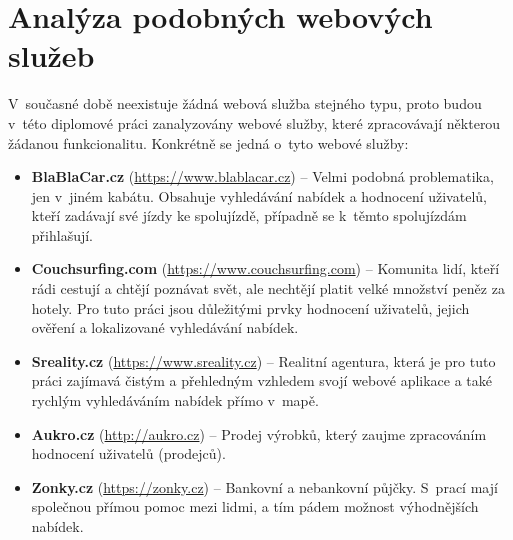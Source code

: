 \chapter{Analýza podobných webových služeb}
\label{analyza}

V~současné době neexistuje žádná webová služba stejného typu, proto budou v~této diplomové práci zanalyzovány webové služby, které zpracovávají některou žádanou funkcionalitu. Konkrétně se jedná o~tyto webové služby:
\begin{itemize}
	\item \textbf{BlaBlaCar.cz} \cite{blablacar} (\url{https://www.blablacar.cz}) -- Velmi podobná problematika, jen v~jiném kabátu. Obsahuje vyhledávání nabídek a hodnocení uživatelů, kteří zadávají své jízdy ke spolujízdě, případně se k~těmto spolujízdám přihlašují.
	\item \textbf{Couchsurfing.com} \cite{couchsurfing} (\url{https://www.couchsurfing.com}) -- Komunita lidí, kteří rádi cestují a chtějí poznávat svět, ale nechtějí platit velké množství peněz za hotely. Pro tuto práci jsou důležitými prvky hodnocení uživatelů, jejich ověření a lokalizované vyhledávání nabídek.
	\item \textbf{Sreality.cz} \cite{sreality} (\url{https://www.sreality.cz}) -- Realitní agentura, která je pro tuto práci zajímavá čistým a přehledným vzhledem svojí webové aplikace a také rychlým vyhledáváním nabídek přímo v~mapě.
	\item \textbf{Aukro.cz} \cite{aukro} (\url{http://aukro.cz}) -- Prodej výrobků, který zaujme zpracováním hodnocení uživatelů (prodejců).
	\item \textbf{Zonky.cz} \cite{zonky} (\url{https://zonky.cz}) -- Bankovní a nebankovní půjčky. S~prací mají společnou přímou pomoc mezi lidmi, a tím pádem možnost výhodnějších nabídek.
\end{itemize}

\newpage

\newpage

\newpage

\newpage

\newpage

